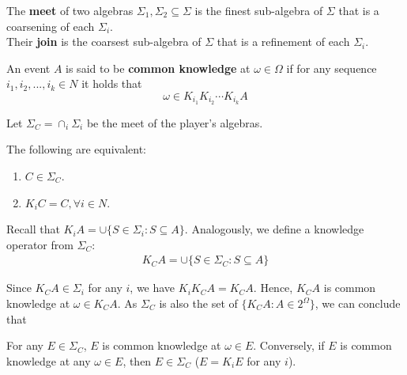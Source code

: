 \documentclass[11pt]{elegantbook_2}
\begin{document}
\begin{definition}
    The \textbf{meet} of two algebras $\Sigma_1, \Sigma_2 \subseteq \Sigma$ is the finest sub-algebra of $\Sigma$ that is a coarsening of each $\Sigma_i$.\\
    Their \textbf{join} is the coarsest sub-algebra of $\Sigma$ that is a refinement of each $\Sigma_i$.
\end{definition}

\begin{definition}
    An event $A$ is said to be \textbf{common knowledge} at $\omega\in\Omega$ if for any sequence $i_1,i_2,...,i_k\in N$ it holds that $$\omega\in K_{i_1}K_{i_2}\cdots K_{i_k}A$$
\end{definition}
Let $\Sigma_C=\cap_i\Sigma_i$ be the meet of the player's algebras.
\begin{proposition}
    The following are equivalent:
    \begin{enumerate}
        \item $C\in\Sigma_C$.
        \item $K_iC=C,\forall i\in N$.
    \end{enumerate}
\end{proposition}
\begin{definition}[$K_C$]
    Recall that $K_i A=\cup\{S\in\Sigma_i:S\subseteq A\}$. Analogously, we define a knowledge operator from $\Sigma_C$:
    \begin{equation}
        \begin{aligned}
            K_CA=\cup\{S\in\Sigma_C:S\subseteq A\}
        \end{aligned}
        \nonumber
    \end{equation}
\end{definition}
Since $K_C A\in\Sigma_i$ for any $i$, we have $K_i K_C A=K_C A$. Hence, $K_C A$ is common knowledge at $\omega\in K_C A$. As $\Sigma_C$ is also the set of $\{K_C A: A\in 2^\Omega\}$, we can conclude that
\begin{proposition}
    For any $E\in\Sigma_C$, $E$ is common knowledge at $\omega\in E$. Conversely, if $E$ is common knowledge at any $\omega \in E$, then $E\in\Sigma_C$ ($E = K_iE$ for any $i$).
\end{proposition}
\end{document}
